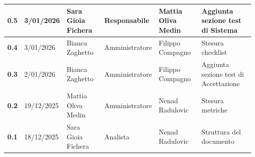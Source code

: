 \documentclass[a4paper,12pt]{article}
\begin{document}
\begin{xltabular}{\textwidth}{|l|l|X|l|X|X|}
                \hline
                \textbf{0.5} & 3/01/2026 & Sara Gioia Fichera & Responsabile & Mattia Oliva Medin & Aggiunta sezione test di Sistema \\
                \hline
                \textbf{0.4} & 3/01/2026 & Bianca Zaghetto & Amministratore & Filippo Compagno & Stesura checklist \\
                \hline
                \textbf{0.3} & 2/01/2026 & Bianca Zaghetto & Amministratore & Filippo Compagno & Aggiunta sezione test di Accettazione \\
                \hline
                \textbf{0.2} & 19/12/2025 & Mattia Oliva Medin & Amministratore & Nenad Radulovic & Stesura metriche\\
                \hline
                \textbf{0.1} & 18/12/2025 & Sara Gioia Fichera & Analista & Nenad Radulovic & Struttura del documento \\
                \hline
    \end{xltabular}
    \newpage
    
    \tableofcontents
    \newpage

    \listoffigures
    \newpage

    \listoftables
    \newpage
    
\end{document}
